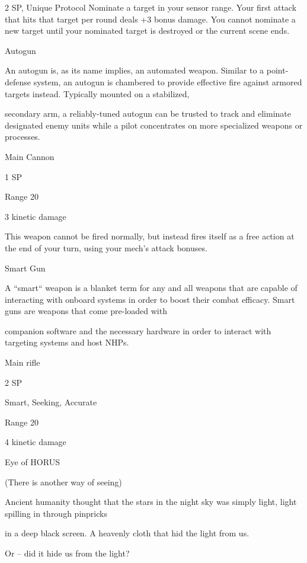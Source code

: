 2 SP, Unique  
Protocol  
Nominate a target in your sensor range. Your first attack that hits that target per round deals +3  
bonus damage. You cannot nominate a new target until your nominated target is destroyed or  
the current scene ends.
 

                                                                                                                  


Autogun  

An autogun is, as its name implies, an automated weapon. Similar to a point-defense system, an autogun is  
chambered to provide effective fire against armored targets instead. Typically mounted on a stabilized,  

secondary arm, a reliably-tuned autogun can be trusted to track and eliminate designated enemy units  
while a pilot concentrates on more specialized weapons or processes.   

Main Cannon
 
1 SP
 
Range 20
 
3 kinetic damage
 
This weapon cannot be fired normally, but instead fires itself as a free action at the end of your  
turn, using your mech’s attack bonuses.
 

Smart Gun  

A “smart“ weapon is a blanket term for any and all weapons that are capable of interacting with onboard  
systems in order to boost their combat efficacy. Smart guns are weapons that come pre-loaded with  

companion software and the necessary hardware in order to interact with targeting systems and host  
NHPs.   

Main rifle
 
2 SP
 
Smart, Seeking, Accurate
 
Range 20
 
4 kinetic damage
 

Eye of HORUS  

(There is another way of seeing)   

Ancient humanity thought that the stars in the night sky was simply light, light spilling in through pinpricks  

in a deep black screen. A heavenly cloth that hid the light from us.   

Or -- did it hide us from the light?   

